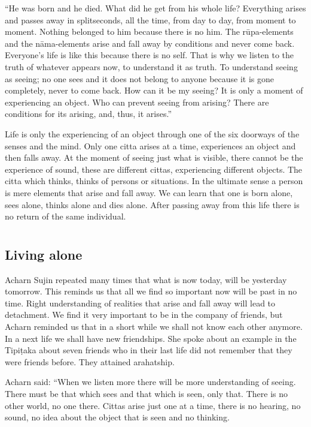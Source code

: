 ``He was born and he died. What did he get from his whole life?
Everything arises and passes away in splitseconds, all the time, from
day to day, from moment to moment. Nothing belonged to him because there
is no him. The rūpa-elements and the nāma-elements arise and fall away
by conditions and never come back. Everyone's life is like this because
there is no self. That is why we listen to the truth of whatever appears
now, to understand it as truth. To understand seeing as seeing; no one
sees and it does not belong to anyone because it is gone completely,
never to come back. How can it be my seeing? It is only a moment of
experiencing an object. Who can prevent seeing from arising? There are
conditions for its arising, and, thus, it arises.''

Life is only the experiencing of an object through one of the six
doorways of the senses and the mind. Only one citta arises at a time,
experiences an object and then falls away. At the moment of seeing just
what is visible, there cannot be the experience of sound, these are
different cittas, experiencing different objects. The citta which
thinks, thinks of persons or situations. In the ultimate sense a person
is mere elements that arise and fall away. We can learn that one is born
alone, sees alone, thinks alone and dies alone. After passing away from
this life there is no return of the same individual.


\chapter[Living alone]{}
\section*{Living alone}

Acharn Sujin repeated many times that what is now today, will be
yesterday tomorrow. This reminds us that all we find so important now
will be past in no time. Right understanding of realities that arise and
fall away will lead to detachment. We find it very important to be in
the company of friends, but Acharn reminded us that in a short while we
shall not know each other anymore. In a next life we shall have new
friendships. She spoke about an example in the Tipiṭaka about seven
friends who in their last life did not remember that they were friends
before. They attained arahatship.

Acharn said: ``When we listen more there will be more understanding of
seeing. There must be that which sees and that which is seen, only that.
There is no other world, no one there. Cittas arise just one at a time,
there is no hearing, no sound, no idea about the object that is seen and
no thinking.

